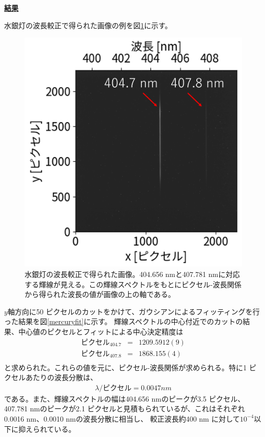 \documentclass[a4paper,11pt,uplatex]{jsbook}
\begin{document}
\noindent \textbf{\underline{結果}}\par
水銀灯の波長較正で得られた画像の例を図\ref{mercury}に示す。
\begin{figure}[h]
  \centering
  \includegraphics[width=0.8\linewidth]{image/4-mercury.png}
  \caption[水銀灯の波長較正-1]{水銀灯の波長較正で得られた画像。404.656 nmと407.781 nmに対応する輝線が見える。この輝線スペクトルをもとにピクセル-波長関係から得られた波長の値が画像の上の軸である。}\label{mercury}
\end{figure}
$y$軸方向に50 ピクセルのカットをかけて、ガウシアンによるフィッティングを行った結果を図\ref{mercuryfit}に示す。
輝線スペクトルの中心付近でのカットの結果、中心値のピクセルとフィットによる中心決定精度は
\begin{eqnarray}
  ピクセル_{404.7} &=& 1209.5912(9)\\
  ピクセル_{407.8} &=& 1868.155(4) \\
\end{eqnarray}
と求められた。これらの値を元に、ピクセル-波長関係が求められる。特に1 ピクセルあたりの波長分散は、
\begin{eqnarray}
  \lambda / ピクセル = 0.0047 nm
\end{eqnarray}
である。また、輝線スペクトルの幅は404.656 nmのピークが3.5 ピクセル、407.781 nmのピークが2.1 ピクセルと見積もられているが、これはそれぞれ0.0016 nm、0.0010 nmの波長分散に相当し、
較正波長約400 nm に対して$10^{-4}$以下に抑えられている。
\end{document}
